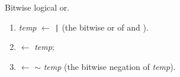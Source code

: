 


Bitwise logical {\sc or}.

\begin{enumerate}

\item {\em temp} $\leftarrow$  \verb$|$ 
		(the bitwise {\sc or} of  and ).

\item {} $\leftarrow$ {\em temp};

\item {}   $\leftarrow$ $\sim$ {\em temp}
		(the bitwise negation of {\em temp}).

\end{enumerate}

